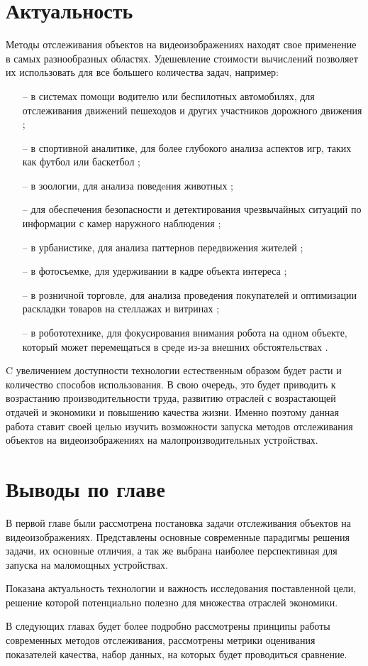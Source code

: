 \section{Актуальность}
Методы отслеживания объектов на видеоизображениях находят свое применение в самых разнообразных областях. 
Удешевление стоимости вычислений позволяет их использовать для все большего количества задач, например:
\begin{itemize}
    \item[--] в системах помощи водителю или беспилотных автомобилях, для отслеживания движений пешеходов и других участников дорожного движения \cite{liu2025vehicle};
    \item[--] в спортивной аналитике, для более глубокого анализа аспектов игр, таких как футбол или баскетбол \cite{naik2022comprehensive};
    \item[--] в зоологии, для анализа поведeния животных \cite{tu2024behavior}; 
    \item[--] для обеспечения безопасности и детектирования чрезвычайных ситуаций по информации с камер наружного наблюдения \cite{antony2024advancing};
    \item[--] в урбанистике, для анализа паттернов передвижения жителей \cite{antony2024advancing};
    \item[--] в фотосъемке, для удерживании в кадре объекта интереса \cite{gemerek2019video};  
    \item[--] в розничной торговле, для анализа проведения покупателей и оптимизации раскладки товаров на стеллажах и витринах \cite{hossam2024revolutionizing};
    \item[--] в робототехнике, для фокусирования внимания робота на одном объекте, который может перемещаться в среде из-за внешних обстоятельствах \cite{guo2024adaptive}. 
\end{itemize}

C увеличением доступности технологии естественным образом будет расти и количество способов использования. 
В свою очередь, это будет приводить к возрастанию производительности труда, развитию отраслей с возрастающей отдачей и экономики и повышению качества жизни.
Именно поэтому данная работа ставит своей целью изучить возможности запуска методов отслеживания объектов на видеоизображениях на малопроизводительных устройствах. 

\section{Выводы по главе}
В первой главе были рассмотрена постановка задачи отслеживания объектов на видеоизображениях. Представлены основные современные парадигмы решения задачи,
их основные отличия, а так же выбрана наиболее перспективная для запуска на маломощных устройствах. 

Показана актуальность технологии и важность исследования поставленной цели, решение которой потенциально полезно для множества отраслей экономики.

В следующих главах будет более подробно рассмотрены принципы работы современных методов отслеживания, рассмотрены метрики оценивания показателей качества, набор данных, на которых будет проводиться сравнение.